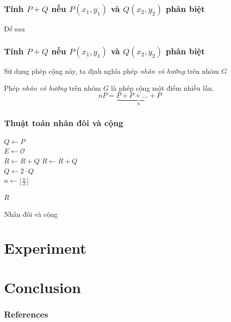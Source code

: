 \documentclass [xcolor=svgnames, t] {beamer}
\theoremstyle{definition}
\begin{document}
\begin{frame}
    \frametitle{Tính $P+Q$ nếu $P(x_1,y_1)$ và $Q(x_2,y_2)$ phân biệt  }
    Để sau


\end{frame}
\begin{frame}
    \frametitle{Tính $P+Q$ nếu $P(x_1,y_1)$ và $Q(x_2,y_2)$ phân biệt  }
    Sử dụng phép cộng này, ta định nghĩa phép \textit{nhân vô hướng} trên nhóm $G$
    \begin{definition}
        Phép \textit{nhân vô hướng} trên nhóm $G$ là phép cộng một điểm nhiều lần.
        \begin{equation}
            nP = \underbrace{P+P+ \ldots +P}_{n}
        \end{equation}
    \end{definition}
\end{frame}
\begin{frame}
    \frametitle{Thuật toán nhân đôi và cộng}

    \begin{algorithm}[H]
        \Begin
        {
            $Q \gets P$ \\
            $E \gets \mathcal{O}$ \\
            {
                {
                    $R \gets R + Q$
                }
                {
                    $R \gets R + Q$ \\
                    $Q \gets 2 \cdot Q$ \\
                    $n \gets \lfloor \frac{n}{2} \rfloor $
                }
            }

            \Return $R$
        }
        \caption{Nhân đôi và cộng}
    \end{algorithm}

\end{frame}
\section{Experiment}

\section{Conclusion}


\begin{frame} [allowframebreaks]\frametitle{References}

    
    
\end{frame}
\end{document}
